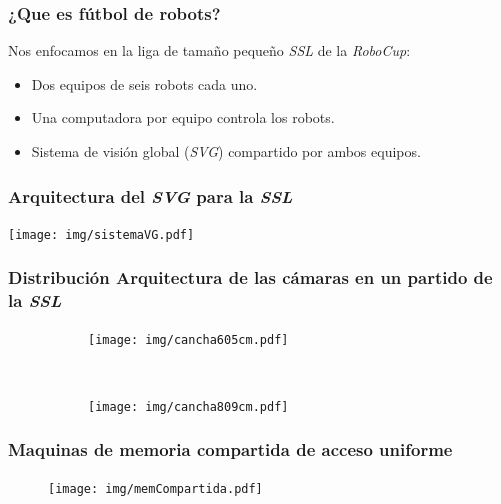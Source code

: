\documentclass[11pt,a4paper,spanish]{beamer}
\begin{document}
\begin{frame}

\frametitle{¿Que es fútbol de robots?}

	Nos enfocamos en la liga de tamaño pequeño \emph{SSL} de la
	\emph{RoboCup}:

\begin{itemize}

	\item Dos equipos de seis robots cada uno.

	\item Una computadora por equipo controla los robots.

	\item Sistema de visión global (\emph{SVG}) compartido por ambos
		equipos.

\end{itemize}

\end{frame}

\begin{frame}

\frametitle{Arquitectura del \emph{SVG} para la \emph{SSL}}

\texttt{[image: img/sistemaVG.pdf]}

\end{frame}

\begin{frame}

\frametitle{Distribución Arquitectura de las cámaras en un partido de la \emph{SSL}}

\begin{figure}[h]

	\centering

	\begin{subfigure}[c]{0.40\textwidth}
		\centering
		\texttt{[image: img/cancha605cm.pdf]}
	\end{subfigure}
	~
	\begin{subfigure}[c]{0.40\textwidth}
		\centering
		\texttt{[image: img/cancha809cm.pdf]}
	\end{subfigure}

\end{figure}

\end{frame}

\begin{frame}

\frametitle{Maquinas de memoria compartida de acceso uniforme}

\begin{figure}[h]

	\centering
	\texttt{[image: img/memCompartida.pdf]}

\end{figure}

\end{frame}
\end{document}
